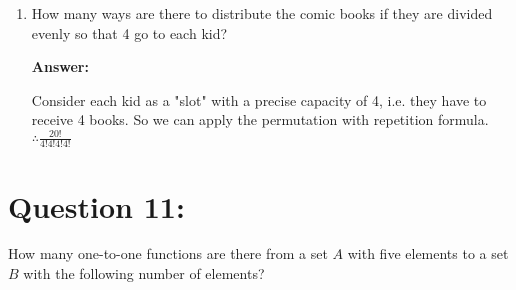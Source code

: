 \documentclass[14pt]{extreport}
\newcommand{\answer}[0]{\medskip \textbf{Answer:} \medskip}
\begin{document}
\begin{enumerate}[label=(\alph*)]
\begin{enumerate}
                    \answer
                    
                    Each book can be given to any kid, which is 5 different ways per book. No other constraints, so simply there are 5 choices 20 times. \\
                    $\therefore 5^{20}$ ways to distribute. \\
                    
            \item How many ways are there to distribute the comic books if they are divided evenly so that 4 go to each kid?
                
                    \answer
                    
                    Consider each kid as a "slot" with a precise capacity of 4, i.e. they have to receive 4 books. So we can apply the permutation with repetition formula. \\
                    $\therefore \displaystyle \frac{20!}{4!4!4!4!}$  \\
 
    \end{enumerate}
            
\end{enumerate}
\newpage

\section*{Question 11:}

How many one-to-one functions are there from a set \( A \) with five elements to a set \( B \) with the following number of elements?
\end{document}

